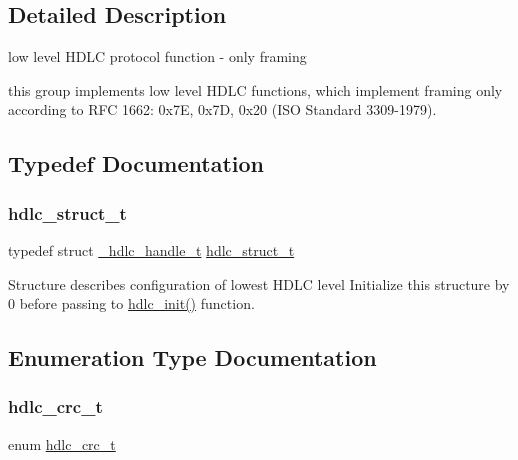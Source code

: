 \subsection{Detailed Description}
low level H\+D\+LC protocol function -\/ only framing 

this group implements low level H\+D\+LC functions, which implement framing only according to R\+FC 1662\+: 0x7E, 0x7D, 0x20 (I\+SO Standard 3309-\/1979). 

\subsection{Typedef Documentation}
\mbox{\label{group__HDLC__API_ga4537a8665b2abe023cb7fe40ea1bd024}} 
\subsubsection{\texorpdfstring{hdlc\+\_\+struct\+\_\+t}{hdlc\_struct\_t}}
{\footnotesize\ttfamily typedef struct \hyperlink{struct__hdlc__handle__t}{\+\_\+hdlc\+\_\+handle\+\_\+t}  \hyperlink{group__HDLC__API_ga4537a8665b2abe023cb7fe40ea1bd024}{hdlc\+\_\+struct\+\_\+t}}

Structure describes configuration of lowest H\+D\+LC level Initialize this structure by 0 before passing to \hyperlink{group__HDLC__API_gaa41c388433273a76460ddfbaff0f8f5d}{hdlc\+\_\+init()} function. 

\subsection{Enumeration Type Documentation}
\mbox{\label{group__HDLC__API_gabb73b32d08d8e79eefe9385634a74bf7}} 
\subsubsection{\texorpdfstring{hdlc\+\_\+crc\+\_\+t}{hdlc\_crc\_t}}
{\footnotesize\ttfamily enum \hyperlink{group__HDLC__API_gabb73b32d08d8e79eefe9385634a74bf7}{hdlc\+\_\+crc\+\_\+t}}

